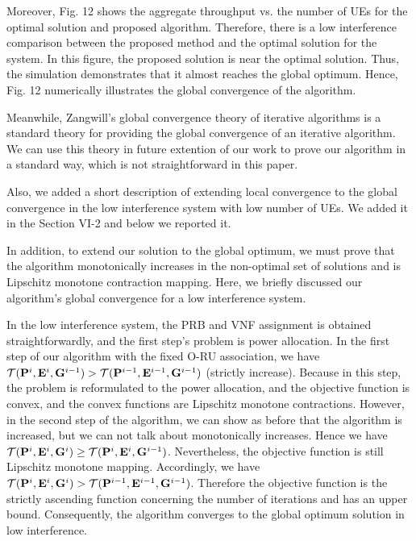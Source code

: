 \documentclass[12pt, letterpaper]{article}
\begin{document}
Moreover, Fig. 12 shows the aggregate throughput vs. the number of UEs for the optimal solution and proposed algorithm. Therefore, there is a low interference comparison between the proposed method and the optimal solution for the system. In this figure, the proposed solution is near the optimal solution. Thus, the simulation demonstrates that it almost reaches the global optimum. Hence, Fig. 12 numerically illustrates the global convergence of the algorithm. 

Meanwhile, Zangwill's global convergence theory of iterative algorithms is a standard theory for providing the global convergence of an iterative algorithm. We can use this theory in future extention of our work to prove our algorithm in a standard way, which is not straightforward in this paper.

Also, we added a short description of extending local convergence to the global convergence in the low interference system with low number of UEs. We added it in the Section VI-2 and below we reported it.

In addition, to extend our solution to the global optimum, we must prove that the algorithm monotonically increases in the non-optimal set of solutions and is Lipschitz monotone contraction mapping. Here, we briefly discussed our algorithm's global convergence for a low interference system.

In the low interference system, the PRB and VNF assignment is obtained straightforwardly, and the first step's problem is power allocation. In the first step of our algorithm with the fixed O-RU association, we have
$\mathcal{T}(\bold{P}^{i},\bold{E}^i,\bold{G}^{i-1}) > \mathcal{T}(\bold{P}^{i-1},\bold{E}^{i-1},\bold{G}^{i-1})$ (strictly increase). 
Because in this step, the problem is reformulated to the power allocation, and the objective function is convex, and the convex functions are Lipschitz monotone contractions. 
However, in the second step of the algorithm, we can show as before that the algorithm is increased, but we can not talk about monotonically increases.
Hence we have
$\mathcal{T}(\bold{P}^{i},\bold{E}^i,\bold{G}^{i}) \geq \mathcal{T}(\bold{P}^{i},\bold{E}^{i},\bold{G}^{i-1})$.
Nevertheless, the objective function is still Lipschitz monotone mapping. 
Accordingly, we have 
$\mathcal{T}(\bold{P}^{i},\bold{E}^i,\bold{G}^{i}) > \mathcal{T}(\bold{P}^{i-1},\bold{E}^{i-1},\bold{G}^{i-1})$.
Therefore the objective function is the strictly ascending
function concerning the number of iterations and has an
upper bound.
Consequently, the algorithm converges to the 
global optimum solution in low interference.
\end{document}
